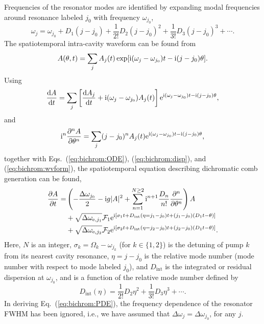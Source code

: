Frequencies of the resonator modes are identified by expanding modal frequencies around resonance labeled $j_0$ with frequency $\omega_{j_0}$,
%
\begin{equation}\label{eq:bichrom:disp}
\omega_j = \omega_{j_0} + D_1 (j-j_0) + \frac{1}{2!}D_2 (j-j_0)^2 + \frac{1}{3!} D_3 (j-j_0)^3 + \cdots .
\end{equation}
%
The spatiotemporal intra-cavity waveform can be found from
%
\begin{equation}\label{eq:bichrom:wvform}
A(\theta, t) = \sum_j A_j(t) \exp[\mathrm{i}(\omega_j-\omega_{j_0})t-\mathrm{i}(j-j_0)\theta].
\end{equation}
%
Using
%
\begin{equation}
\frac{\mathrm{d}A}{\mathrm{d}t} = \sum_j \left[\frac{\mathrm{d}A_j}{\mathrm{d}t}+\mathrm{i} (\omega_j - \omega_{j_0}) A_j(t)\right] \mathrm{e}^{\mathrm{i}(\omega_j-\omega_{j_0})t-\mathrm{i}(j-j_0)\theta},
\end{equation}
%
and
%
\begin{equation}
\mathrm{i}^n \frac{\partial^n A}{\partial \theta^n} = \sum_j (j-j_0)^n A_j(t) \mathrm{e}^{\mathrm{i}(\omega_j-\omega_{j_0})t-\mathrm{i}(j-j_0)\theta},
\end{equation}
%
together with Eqs.~(\ref{eq:bichrom:ODE}), (\ref{eq:bichrom:disp}),  and (\ref{eq:bichrom:wvform}), the spatiotemporal equation describing dichromatic comb generation can be found,
%
\begin{align} \label{eq:bichrom:PDE}
\frac{\partial A}{\partial t} = & \left( -\frac{\Delta \omega_{j_0}}{2} -\mathrm{i} g |A|^2 + \sum_{n=1}^{N \ge 2} \mathrm{i}^{n+1} \frac{D_n}{n!}\frac{\partial^n}{\partial\theta^n} \right) A \nonumber \\
& + \sqrt{\Delta\omega_{\mathrm{e},j_1}}\mathcal{F}_1 \mathrm{e}^{ \mathrm{i} \left[ \sigma_1 t + D_{\mathrm{int}}(\eta = j_1-j_0) t + (j_1-j_0)(D_1 t - \theta) \right] } \nonumber \\
& + \sqrt{\Delta\omega_{\mathrm{e},j_2}}\mathcal{F}_2 \mathrm{e}^{ \mathrm{i} \left[ \sigma_2 t + D_{\mathrm{int}}(\eta = j_2-j_0) t + (j_2-j_0)(D_1 t - \theta) \right] }.
\end{align}
%
Here, $N$ is an integer, $\sigma_k=\Omega_k - \omega_{j_k}$ (for $k \in \{1, 2 \}$) is the detuning of pump $k$ from its nearest cavity resonance, $\eta = j-j_0$ is the relative mode number (mode number with respect to mode labeled $j_0$), and $D_{\mathrm{int}}$ is the integrated or residual dispersion at $\omega_{j_0}$, and is a function of the relative mode number defined by
%
\begin{equation}
D_{\mathrm{int}}(\eta) = \frac{1}{2!} D_2 \eta^2 + \frac{1}{3!} D_3 \eta^3+\cdots .
\end{equation}
%
In deriving Eq.~(\ref{eq:bichrom:PDE}), the frequency dependence of the resonator FWHM has been ignored, i.e., we have assumed that $\Delta\omega_{j}=\Delta\omega_{j_0}$, for any $j$.

